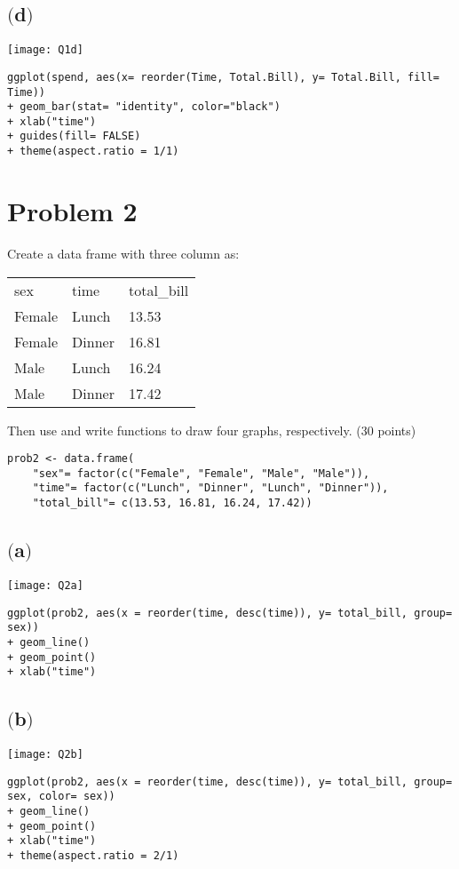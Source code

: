 \documentclass[a4paper,man,natbib]{apa6}
\begin{document}
\subsection{$($d$)$}
\texttt{[image: Q1d]}
\begin{verbatim}
ggplot(spend, aes(x= reorder(Time, Total.Bill), y= Total.Bill, fill= Time)) 
+ geom_bar(stat= "identity", color="black") 
+ xlab("time") 
+ guides(fill= FALSE) 
+ theme(aspect.ratio = 1/1)
\end{verbatim}

\newpage
\section{Problem 2}
Create a data frame with three column as: 
\begin{center}
	\begin{tabular}{l l l}
		sex		& time		& total\_bill \\
		Female	& Lunch		& 13.53	\\
		Female	& Dinner	& 16.81 \\
		Male	& Lunch		& 16.24 \\
		Male	& Dinner	& 17.42 \\	
	\end{tabular} 
\end{center}
Then use and write functions to draw four graphs, respectively. (30 points) \\
\begin{verbatim}
prob2 <- data.frame(
	"sex"= factor(c("Female", "Female", "Male", "Male")), 
	"time"= factor(c("Lunch", "Dinner", "Lunch", "Dinner")), 
	"total_bill"= c(13.53, 16.81, 16.24, 17.42))
\end{verbatim}

\subsection{$($a$)$}
\texttt{[image: Q2a]}
\begin{verbatim}
ggplot(prob2, aes(x = reorder(time, desc(time)), y= total_bill, group= sex)) 
+ geom_line() 
+ geom_point() 
+ xlab("time")
\end{verbatim}

\newpage
\subsection{$($b$)$}
\texttt{[image: Q2b]}
\begin{verbatim}
ggplot(prob2, aes(x = reorder(time, desc(time)), y= total_bill, group= sex, color= sex)) 
+ geom_line() 
+ geom_point() 
+ xlab("time") 
+ theme(aspect.ratio = 2/1)
\end{verbatim}
\end{document}
